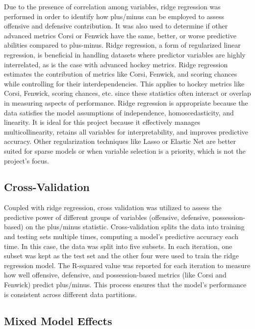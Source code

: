 \documentclass[12pt]{article}
\begin{document}
Due to the presence of correlation among variables, ridge regression was performed in order to identify how plus/minus can be employed 
to assess offensive and defensive contribution. It was also used to determine if other advanced metrics Corsi or Fenwick have the same, 
better, or worse predictive abilities compared to plus-minus. Ridge regression, a form of regularized linear regression, is beneficial 
in handling datasets where predictor variables are highly interrelated, as is the case with advanced hockey metrics. Ridge regression 
estimates the contribution of metrics like Corsi, Fenwick, and scoring chances while controlling for their interdependencies. This 
applies to hockey metrics like Corsi, Fenwick, scoring chances, etc. since these statistics often interact or overlap in measuring aspects 
of performance. Ridge regression is appropriate because the data satisfies the model assumptions of independence, homoscedasticity, 
and linearity. It is ideal for this project because it effectively manages multicollinearity, retains all variables for interpretability, 
and improves predictive accuracy. Other regularization techniques like Lasso or Elastic Net are better suited for sparse models or when 
variable selection is a priority, which is not the project's focus.

\subsection{Cross-Validation}

Coupled with ridge regression, cross validation was utilized to assess the predictive power of different groups of variables (offensive, 
defensive, possession-based) on the plus/minus statistic. Cross-validation splits the data into training and testing sets multiple times, 
computing a model's predictive accuracy each time. In this case, the data was split into five subsets. In each iteration, one subset was
kept as the test set and the other four were used to train the ridge regression model. The R-squared value was reported for each iteration
to measure how well offensive, defensive, and possession-based metrics (like Corsi and Fenwick) predict plus/minus. This process ensures 
that the model’s performance is consistent across different data partitions.

\subsection{Mixed Model Effects}
\end{document}

